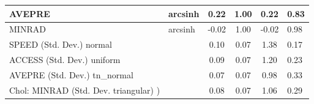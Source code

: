 \begin{table}
\begin{center}
\begin{tabular}{|l|l|c|c|c|l|}
			\hline
			AVEPRE & arcsinh & 0.22 & 1.00 & 0.22 & 0.83 \\
			\hline
			MINRAD & arcsinh & -0.02 & 1.00 & -0.02 & 0.98 \\
			\hline
			SPEED (Std. Dev.) normal &  & 0.10 & 0.07 & 1.38 & 0.17 \\
			\hline
			ACCESS (Std. Dev.) uniform &  & 0.09 & 0.07 & 1.20 & 0.23 \\
			\hline
			AVEPRE (Std. Dev.) tn_normal &  & 0.07 & 0.07 & 0.98 & 0.33 \\
			\hline
			 Chol: MINRAD (Std. Dev. triangular) ) &  & 0.08 & 0.07 & 1.06 & 0.29 \\
			\hline
		\end{tabular}
	\end{center}
\end{table}